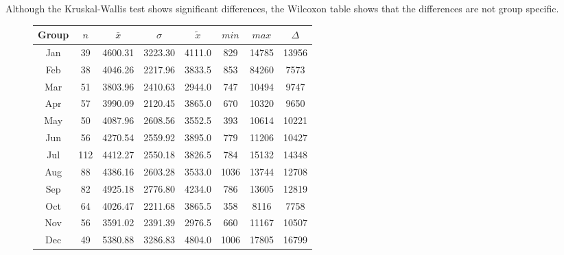 Although the Kruskal-Wallis test shows significant differences, the Wilcoxon table shows that the differences are not group specific.
\begin{figure}[ht!]
	\centering
	\begin{minipage}{0.5\textwidth}
		\tiny
		\setlength{\tabcolsep}{4pt}
		\centering
		\begin{tabular}{c|c|c|c|c|c|c|c}
			\toprule
			Group & $n$ & $\bar{x}$ & $\sigma$ & $\tilde{x}$ & $min$ & $max$ & $\Delta$ \\
			\midrule
			Jan & 39  & 4600.31 & 3223.30 & 4111.0 & 829  & 14785 & 13956 \\ 
			Feb & 38  & 4046.26 & 2217.96 & 3833.5 & 853  & 84260 & 7573  \\ 
			Mar & 51  & 3803.96 & 2410.63 & 2944.0 & 747  & 10494 & 9747  \\ 
			Apr & 57  & 3990.09 & 2120.45 & 3865.0 & 670  & 10320 & 9650  \\ 
			May & 50  & 4087.96 & 2608.56 & 3552.5 & 393  & 10614 & 10221 \\ 
			Jun & 56  & 4270.54 & 2559.92 & 3895.0 & 779  & 11206 & 10427 \\ 
			Jul & 112 & 4412.27 & 2550.18 & 3826.5 & 784  & 15132 & 14348 \\ 
			Aug & 88  & 4386.16 & 2603.28 & 3533.0 & 1036 & 13744 & 12708 \\ 
			Sep & 82  & 4925.18 & 2776.80 & 4234.0 & 786  & 13605 & 12819 \\ 
			Oct & 64  & 4026.47 & 2211.68 & 3865.5 & 358  & 8116  & 7758  \\ 
			Nov & 56  & 3591.02 & 2391.39 & 2976.5 & 660  & 11167 & 10507 \\ 
			Dec & 49  & 5380.88 & 3286.83 & 4804.0 & 1006 & 17805 & 16799 \\ 
			\bottomrule
		\end{tabular}
		\label{tbl:descriptives_baysis_effector_Month_SAvg}
	\end{minipage}%
	\begin{minipage}{0.55\textwidth}
\end{minipage}
\end{figure}
